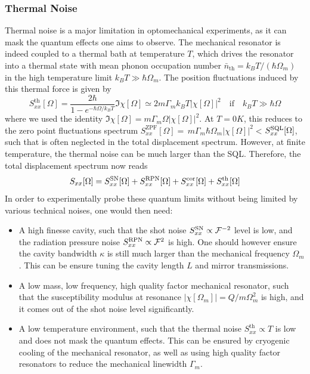\subsubsection{Thermal Noise}
Thermal noise is a major limitation in optomechanical experiments, as it can mask the quantum effects one aims to observe. The mechanical resonator is indeed coupled to a thermal bath at temperature $T$, which drives the resonator into a thermal state with mean phonon occupation number $\bar n_{\mathrm{th}} = k_B T / (\hbar \Omega_m)$ in the high temperature limit $k_B T \gg \hbar \Omega_m$. The position fluctuations induced by this thermal force is given by
\begin{equation}
  S_{xx}^{\mathrm{th}}[\Omega] = \dfrac{2\hbar}{1 - e^{-\hbar \Omega / k_B T}} \Im \chi[\Omega] \simeq 2 m \Gamma_m k_B T |\chi[\Omega]|^2 \quad \text{if} \quad k_B T \gg \hbar \Omega
\end{equation}
where we used the identity $\Im \chi[\Omega] = m\Gamma_m \Omega |\chi[\Omega]|^2$. At $T=0K$, this reduces to the zero point fluctuations spectrum $S_{xx}^{\mathrm{ZPF}}[\Omega] =\, m \Gamma_m \hbar \Omega_m  |\chi[\Omega]|^2 < $$S_{xx}^{\rm SQL}[\Omega]$, such that is often neglected in the total displacement spectrum. However, at finite temperature, the thermal noise can be much larger than the SQL. Therefore, the total displacement spectrum now reads
\begin{equation}
  S_{xx}[\Omega] = S_{xx}^{\rm SN}[\Omega] + S_{xx}^{\rm RPN}[\Omega] + S_{xx}^{\rm cor}[\Omega] + S_{xx}^{\mathrm{th}}[\Omega]
\end{equation}
In order to experimentally probe these quantum limits without being limited by various technical noises, one would then need: 
\begin{itemize}
  \item A high finesse cavity, such that the shot noise $S_{xx}^{\rm SN} \propto \mathcal{F}^{-2}$ level is low, and the radiation pressure noise $S_{xx}^{\rm RPN} \propto \mathcal{F}^{2}$ is high. One should however ensure the cavity bandwidth $\kappa$ is still much larger than the mechanical frequency $\Omega_m$. This can be ensure tuning the cavity length $L$ and mirror transmissions.
  \item A low mass, low frequency, high quality factor mechanical resonator, such that the susceptibility modulus at resonance $|\chi[\Omega_m]|=Q/m \Omega_{m}^2$ is high, and it comes out of the shot noise level significantly. 
  \item A low temperature environment, such that the thermal noise $S_{xx}^{\mathrm{th}} \propto T$ is low and does not mask the quantum effects. This can be ensured by cryogenic cooling of the mechanical resonator, as well as using high quality factor resonators to reduce the mechanical linewidth $\Gamma_m$.
\end{itemize}


